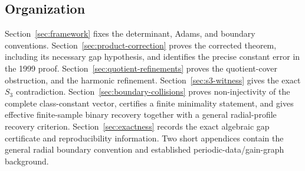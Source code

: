 \subsection{Organization}

Section~\ref{sec:framework} fixes the determinant, Adams, and boundary
conventions.  Section~\ref{sec:product-correction} proves the corrected
theorem, including its necessary gap hypothesis, and identifies the precise
constant error in the 1999 proof.
Section~\ref{sec:quotient-refinements} proves the quotient-cover obstruction,
and the harmonic refinement.
Section~\ref{sec:s3-witness} gives the exact \(S_3\) contradiction.
Section~\ref{sec:boundary-collisions} proves non-injectivity of the complete
class-constant vector, certifies a finite minimality statement, and gives
effective finite-sample binary recovery together with a general radial-profile
recovery criterion.
Section~\ref{sec:exactness} records the exact algebraic gap certificate and
reproducibility information.  Two short appendices contain the general radial
boundary convention and established periodic-data/gain-graph background.
